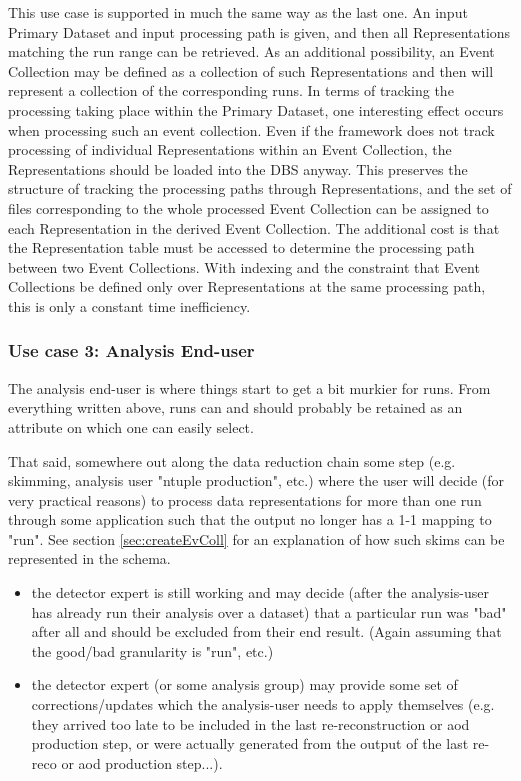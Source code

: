 \documentclass{cmspaper}
\begin{document}
This use case is supported in much the same way as the last one.  An input 
Primary Dataset and input processing path is given, and then all Representations
matching the run range can be retrieved.  As an additional possibility, an 
Event Collection may be defined as a collection of such Representations and then will 
represent a collection of the corresponding runs.  In terms of tracking the processing
taking place within the Primary Dataset, one interesting effect occurs when 
processing such an event collection.  Even if the framework does not track processing
of individual Representations within an Event Collection, the Representations 
should be loaded into the DBS anyway.  This preserves the structure of tracking 
the processing paths through Representations, and the set of 
files corresponding to the whole processed Event Collection can be assigned to 
each Representation in the derived Event Collection.  The additional cost is that 
the Representation table must be accessed to determine the processing path between 
two Event Collections.  With indexing and the constraint that Event Collections be 
defined only over Representations at the same processing path, this is only a 
constant time inefficiency.


\subsubsection{Use case 3: Analysis End-user}

  The analysis end-user is where things start to get a bit murkier for runs.
From everything written above, runs can and should probably be retained as 
an attribute on which one can easily select.

  That said, somewhere out along the data reduction chain some step (e.g. 
skimming, analysis user "ntuple production", etc.) where the user will
decide (for very practical reasons) to process data representations for more
than one run through some application such that the output no longer has
a 1-1 mapping to "run". See section \ref{sec:createEvColl} for an explanation of how such 
skims can be represented in the schema.


\begin{itemize}
\item the detector expert is still working and may decide (after the 
     analysis-user has already run their analysis over a dataset) that a
     particular run was "bad" after all and should be excluded from their
     end result. (Again assuming that the good/bad granularity is "run", etc.)
\item the detector expert (or some analysis group) may provide some set of
     corrections/updates which the analysis-user needs to apply themselves
     (e.g. they arrived too late to be included in the last re-reconstruction
     or aod production step, or were actually generated from the output of
     the last re-reco or aod production step...). 
\end{itemize}
\end{document}
